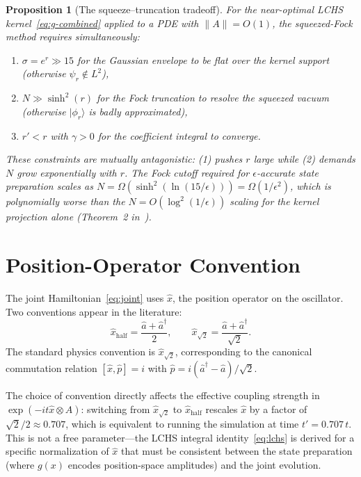 \documentclass[11pt]{article}
\newtheorem{proposition}{Proposition}
\begin{document}
\begin{proposition}[The squeeze--truncation tradeoff]
For the near-optimal LCHS kernel~\eqref{eq:g-combined} applied to a PDE with
$\|A\| = O(1)$, the squeezed-Fock method requires simultaneously:
\begin{enumerate}[itemsep=2pt]
  \item $\sigma = e^r \gg 15$ for the Gaussian envelope to be flat over the
        kernel support (otherwise $\psi_r \notin L^2$),
  \item $N \gg \sinh^2(r)$ for the Fock truncation to resolve the squeezed
        vacuum (otherwise $|\phi_r\rangle$ is badly approximated),
  \item $r' < r$ with $\gamma > 0$ for the coefficient integral to converge.
\end{enumerate}
These constraints are mutually antagonistic: (1) pushes $r$ large while (2)
demands $N$ grow exponentially with $r$.  The Fock cutoff required for
$\epsilon$-accurate state preparation scales as
$N = \Omega(\sinh^2(\ln(15/\epsilon))) = \Omega(1/\epsilon^2)$,
which is polynomially worse than the $N = O(\log^2(1/\epsilon))$ scaling
for the kernel projection alone (Theorem~2 in~\cite{das2025}).
\end{proposition}

\section{Position-Operator Convention}\label{sec:convention}

The joint Hamiltonian~\eqref{eq:joint} uses $\hat{x}$, the position operator
on the oscillator.  Two conventions appear in the literature:
\begin{equation}\label{eq:conventions}
  \hat{x}_{\text{half}} = \frac{\hat{a}+\hat{a}^\dagger}{2},
  \qquad
  \hat{x}_{\sqrt{2}} = \frac{\hat{a}+\hat{a}^\dagger}{\sqrt{2}}.
\end{equation}
The standard physics convention is $\hat{x}_{\sqrt{2}}$, corresponding to the
canonical commutation relation $[\hat{x},\hat{p}] = i$ with
$\hat{p} = i(\hat{a}^\dagger - \hat{a})/\sqrt{2}$.

The choice of convention directly affects the effective coupling strength in
$\exp(-it\hat{x}\otimes A)$: switching from $\hat{x}_{\sqrt{2}}$ to
$\hat{x}_{\text{half}}$ rescales $\hat{x}$ by a factor of
$\sqrt{2}/2 \approx 0.707$, which is equivalent to running the simulation
at time $t' = 0.707\,t$.  This is not a free parameter---the LCHS integral
identity~\eqref{eq:lchs} is derived for a specific normalization of $\hat{x}$
that must be consistent between the state preparation (where $g(x)$ encodes
position-space amplitudes) and the joint evolution.
\end{document}

